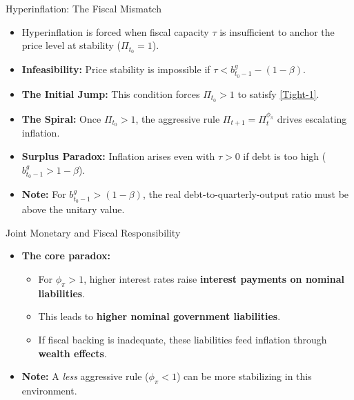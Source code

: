 \documentclass[11pt,aspectratio=169]{beamer}
\begin{document}
\begin{frame}{Hyperinflation: The Fiscal Mismatch}
\small


\begin{itemize}
    \item Hyperinflation is forced when fiscal capacity $\tau$ is insufficient to anchor the price level at stability ($\Pi_{t_0}=1$).
    
    \item \textbf{Infeasibility:} Price stability is impossible if $\tau < b_{t_{0}-1}^{g} - (1-\beta)$.
    \item \textbf{The Initial Jump:} This condition forces $\Pi_{t_0} > 1$ to satisfy \eqref{Tight-1}.
    \item \textbf{The Spiral:} Once $\Pi_{t_0} > 1$, the aggressive rule $\Pi_{t+1} = \Pi_t^{\phi_\pi}$ drives escalating inflation.
    \item \textbf{Surplus Paradox:} Inflation arises even with $\tau > 0$ if debt is too high ($b_{t_{0}-1}^{g} > 1-\beta$). 
    \item \textbf{Note:} For $b_{t_{0}-1}^{g} > (1-\beta)$, the real debt-to-quarterly-output ratio must be above the unitary value.
\end{itemize}
\end{frame}

\begin{frame}{Joint Monetary and Fiscal Responsibility}
\small

\begin{itemize}
    \item \textbf{The core paradox:}
    \vspace{0.2cm}
    \begin{itemize}
        \item For \(\phi_\pi>1\), higher interest rates raise \textbf{interest payments on nominal liabilities}.
        \vspace{0.25em}
        \item This leads to \textbf{higher nominal government liabilities}.
        \vspace{0.25em}
        \item If fiscal backing is inadequate, these liabilities feed inflation through \textbf{wealth effects}.
    \end{itemize}

    \vspace{0.25cm}
    \item \textbf{Note:} A \emph{less} aggressive rule (\(\phi_\pi<1\)) can be more stabilizing in this environment.
\end{itemize}

\end{frame}
\end{document}
